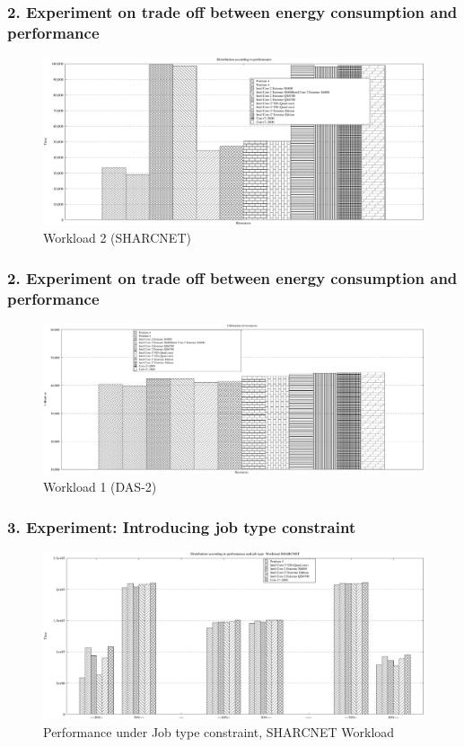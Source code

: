 \documentclass{beamer}
\begin{document}
\begin{frame}
 \frametitle{2. Experiment on trade off between energy consumption and performance}
\begin{figure}[h]
\centering
    \includegraphics[width=\textwidth]{imgs/case2SHARCNET}
    \caption{Workload 2 (SHARCNET)}
\end{figure}
\end{frame}

\begin{frame}
  \frametitle{2. Experiment on trade off between energy consumption and performance}
\begin{figure}[h]
\centering
    \includegraphics[width=\textwidth]{imgs/case2DAS}
    \caption{Workload 1 (DAS-2)}
\end{figure}
\end{frame}

\begin{frame}
\frametitle{3. Experiment: Introducing job type constraint}
 \begin{figure}[h]
\centering
    \includegraphics[width=1.0\columnwidth]{imgs/case3_SHARCNET}
    \caption{Performance under Job type constraint, SHARCNET Workload}
\label{jobtype1}
\end{figure}
\end{frame}
\end{document}
